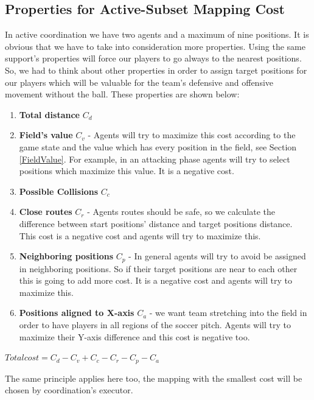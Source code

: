 \subsection{Properties for Active-Subset Mapping Cost}
In active coordination we have two agents and a maximum of nine positions. It is obvious that we have to take into consideration more properties. Using the same support's properties will force our players to go always to the nearest positions. So, we had to think about other properties in order to assign target positions for our players which will be valuable for the team's defensive and offensive movement without the ball. These properties are shown below:
\begin{enumerate}
\item \textbf{Total distance }$C_{d}$
\item \textbf{Field's value }$C_{v}$ - Agents will try to maximize this cost according to the game state and the value which has every position in the field, see Section \ref{FieldValue}. For example, in an attacking phase agents will try to select positions which maximize this value. It is a negative cost.
\item \textbf{Possible Collisions }$C_{c}$
\item \textbf{Close routes }$C_{r}$ - Agents routes should be safe, so we calculate the difference between start positions' distance and target positions distance. This cost is a negative cost and agents will try to maximize this.
\item \textbf{Neighboring positions }$C_{p}$ - In general agents will try to avoid be assigned in neighboring positions. So if their target positions are near to each other this is going to add more cost. It is a negative cost and agents will try to maximize this.
\item \textbf{Positions aligned to X-axis }$C_{a}$ - we want team stretching into the field in order to have players in all regions of the soccer pitch. Agents will try to maximize their Y-axis difference and this cost is negative too. 
\end{enumerate}
\begin{center}
$Total cost = C_{d}-C_{v}+C_{c}-C_{r}-C_{p}-C_{a}$
\end{center}
The same principle applies here too, the mapping with the smallest cost will be chosen by coordination's executor.